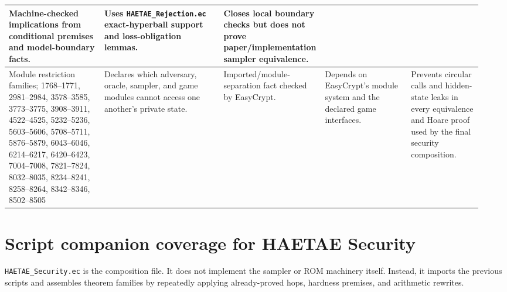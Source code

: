 \documentclass[11pt]{report}
\DeclareRobustCommand{\file}[1]{\ifmmode\text{\nolinkurl{#1}}\else\nolinkurl{#1}\fi}
\theoremstyle{definition}
\theoremstyle{plain}
\begin{document}
{\begin{longtable}{p{0.20\linewidth}p{0.25\linewidth}p{0.16\linewidth}p{0.18\linewidth}p{0.15\linewidth}}
Machine-checked implications from conditional premises and model-boundary facts. &
Uses \file{HAETAE\_Rejection.ec} exact-hyperball support and loss-obligation
lemmas. &
Closes local boundary checks but does not prove paper/implementation sampler
equivalence. \\
\midrule
Module restriction families; 1768--1771, 2981--2984, 3578--3585,
3773--3775, 3908--3911, 4522--4525, 5232--5236, 5603--5606,
5708--5711, 5876--5879, 6043--6046, 6214--6217, 6420--6423,
7004--7008, 7821--7824, 8032--8035, 8234--8241, 8258--8264,
8342--8346, 8502--8505 &
Declares which adversary, oracle, sampler, and game modules cannot access one
another's private state. &
Imported/module-separation fact checked by EasyCrypt. &
Depends on EasyCrypt's module system and the declared game interfaces. &
Prevents circular calls and hidden-state leaks in every equivalence and Hoare
proof used by the final security composition. \\
\bottomrule
\end{longtable}
}

\section{Script companion coverage for HAETAE Security}

\file{HAETAE\_Security.ec} is the composition file.  It does not implement the
sampler or ROM machinery itself.  Instead, it imports the previous scripts and
assembles theorem families by repeatedly applying already-proved hops, hardness
premises, and arithmetic rewrites.
\end{document}
